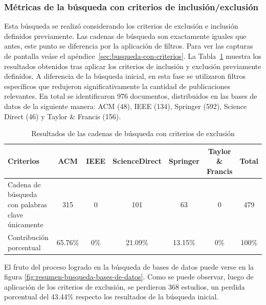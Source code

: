 \subsubsection{Métricas de la búsqueda con criterios de inclusión/exclusión}\label{subsec:resumenBusquedaCriterios}
\noindent
Esta búsqueda se realizó considerando los criterios de exclusión e inclusión definidos previamente. Las cadenas de búsqueda son exactamente iguales que antes, este punto se diferencia por la aplicación de filtros. Para ver las capturas de pantalla veáse el apéndice~\ref{sec:busqueda-con-criterios}.
La Tabla~\ref{table:bases-con-exclusion} muestra los resultados obtenidos tras aplicar los criterios de inclusión y exclusión previamente definidos. A diferencia de la búsqueda inicial, en esta fase se utilizaron filtros específicos que redujeron significativamente la cantidad de publicaciones relevantes. En total se identificaron 976 documentos, distribuidos en las bases de datos de la siguiente manera: ACM (48), IEEE (134), Springer (592), Science Direct (46) y Taylor \& Francis (156).

\begin{table}[H]
	\centering
	\caption{Resultados de las cadenas de búsqueda con criterios de exclusión}
	\label{table:bases-con-exclusion}
	\begin{tabular}{|p{4.5cm}|c|c|c|c|c|c|}
		\hline
		\textbf{Criterios}                               & \textbf{ACM} & \textbf{IEEE} & \textbf{ScienceDirect} & \textbf{Springer} & \textbf{Taylor \& Francis} & \textbf{Total} \\
		\hline
		Cadena de búsqueda con palabras clave únicamente & 315          & 0             & 101                    & 63                & 0                          & 479            \\
		\hline
		Contribución porcentual                          & 65.76\%      & 0\%           & 21.09\%                & 13.15\%           & 0\%                        & 100\%          \\
		\hline
	\end{tabular}
\end{table}

El fruto del proceso logrado en la búsqueda de bases de datos puede verse en la figura \ref{fig:resumen-busqueda-bases-de-datos}. Como se puede observar, luego de aplicación de los criterios de exclusión, se perdieron 368 estudios, un perdida porcentual del 43.44\% respecto los resultados de la búsqueda inicial.

